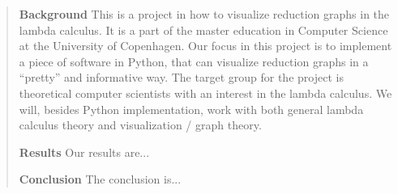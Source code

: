 
\begin{abstract}

\textbf{Background} This is a project in how to visualize reduction graphs in
the lambda calculus. It is a part of the master education in Computer Science
at the University of Copenhagen. Our focus in this project is to implement a
piece of software in Python, that can visualize reduction graphs in a
``pretty'' and informative way. The target group for the project is
theoretical computer scientists with an interest in the lambda calculus. We
will, besides Python implementation, work with both general lambda calculus
theory and visualization / graph theory.

\textbf{Results} Our results are...

\textbf{Conclusion} The conclusion is...

\end{abstract}